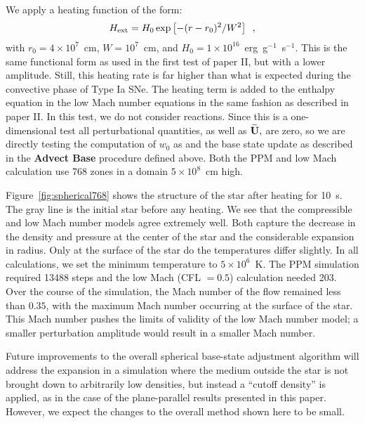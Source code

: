 We apply a heating function of the form:
\begin{equation}
{H_{\rm ext}} = H_0 \exp \left [-(r-r_0)^2 / W^2 \right ] \enskip ,
\end{equation}
with $r_0 = 4\times 10^7$~cm, $W = 10^7$~cm, and $H_0 = 1\times
10^{16}$~erg~g$^{-1}$~s$^{-1}$. This is the same functional form as used
in the first test of paper II, but with a lower amplitude.  Still, this
heating rate is far higher than what is expected during the convective
phase of Type Ia SNe.  The heating term is added to the enthalpy
equation in the low Mach number equations in the same fashion as
described in paper II.  In this test, we do not consider reactions.
Since this is a one-dimensional test all perturbational quantities,
as well as $\widetilde{{\bf U}},$ are zero, so we are directly testing the computation of 
$w_0$ as and the base state update as described in
the {\bf Advect Base} procedure defined above.  
Both the PPM and low Mach calculation use 768 zones in a domain $5\times
10^8$~cm high.

Figure~\ref{fig:spherical768} shows the structure of the star after
heating for 10~s.  The gray line is the initial star before any
heating.  
We see that the compressible and low Mach number models
agree extremely well.  Both capture the decrease in the density and
pressure at the center of the star and the considerable expansion in
radius.  Only at the surface of the star do the temperatures differ slightly.
In all calculations, we set the minimum temperature to $5\times
10^6$~K.  The PPM simulation required 13488 steps and the low Mach
(CFL $=0.5$) calculation needed 203.  Over the course of the
simulation, the Mach number of the flow remained less than $0.35$, with the
maximum Mach number occurring at the surface of the star.  This Mach
number pushes the limits of validity of the low Mach number model;  a
smaller perturbation amplitude would result in a smaller Mach number.

Future improvements to the overall spherical base-state adjustment
algorithm will address the expansion in a simulation where the medium
outside the star is not brought down to arbitrarily low densities, but
instead a ``cutoff density'' is applied, as in the case of the
plane-parallel results presented in this paper. However, we expect
the changes to the overall method shown here to be small. 

